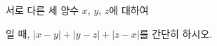 서로 다른 세 양수 $x$, $y$, $z$에 대하여\par\smallskip{}\par\smallskip\noindent 일 때, $|x-y|+|y-z|+|z-x|$를 간단히 하시오.
